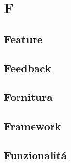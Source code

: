 \section{F} 
\subsection{Feature} 

\subsection{Feedback} 

\subsection{Fornitura} 

\subsection{Framework} 

\subsection{Funzionalitá} 


